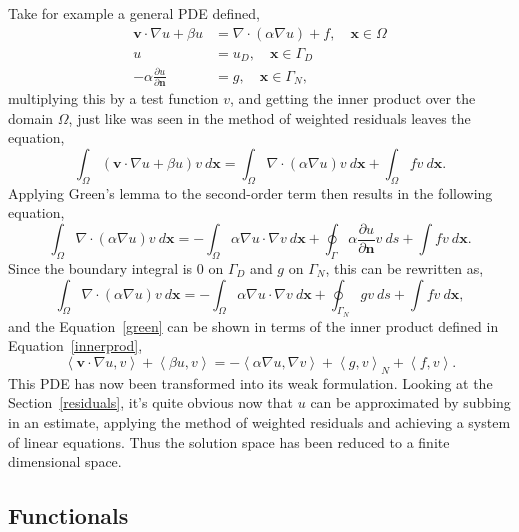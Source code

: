 Take for example a general PDE defined,
\begin{align}
	\mathbf{v}\cdot\nabla u + \beta u &= \nabla\cdot(\alpha\nabla u) + f,\quad  \mathbf{x} \in \Omega \\
	u &= u_D,\quad \mathbf{x} \in \Gamma_D\\
	-\alpha\frac{\partial u}{\partial \mathbf{n}} &= g,\quad \mathbf{x} \in \Gamma_N,
\end{align}
multiplying this by a test function $v$, and getting the inner product over the domain $\Omega$, just like was seen in the method of weighted residuals leaves the equation,
\begin{equation}\label{green}
		\int_{\Omega}(\mathbf{v}\cdot\nabla u + \beta u)v~d\mathbf{x} = \int_{\Omega}\nabla\cdot(\alpha\nabla u)v~d\mathbf{x} + \int_{\Omega}fv~d\mathbf{x}.
\end{equation}
Applying Green's lemma to the second-order term then results in the following equation,
\begin{equation}
	\int_{\Omega}\nabla\cdot(\alpha\nabla u)v~d\mathbf{x} = -\int_{\Omega}\alpha\nabla u\cdot \nabla v~d\mathbf{x} + \oint_{\Gamma} \alpha \frac{\partial u}{\partial \mathbf{n}} v~ds + \int fv~d\mathbf{x}.
\end{equation}
Since the boundary integral is $0$ on $\Gamma_D$ and $g$ on $\Gamma_N$, this can be rewritten as,
\begin{equation}
	\int_{\Omega}\nabla\cdot(\alpha\nabla u)v~d\mathbf{x} = -\int_{\Omega}\alpha\nabla u\cdot \nabla v~d\mathbf{x} + \oint_{\Gamma_N} gv~ds + \int fv~d\mathbf{x},
\end{equation}
and the Equation~\eqref{green} can be shown in terms of the inner product defined in Equation~\eqref{innerprod},
\begin{equation}\label{weak}
	\left\langle\mathbf{v}\cdot\nabla u,v\right\rangle + \left\langle\beta u,v\right\rangle = -\left\langle\alpha\nabla u, \nabla v\right\rangle + \left\langle g,v\right\rangle_N + \left\langle f,v\right\rangle.
\end{equation}
This PDE has now been transformed into its weak formulation. Looking at the Section~\ref{residuals}, it's quite obvious now that $u$ can be approximated by subbing in an estimate, applying the method of weighted residuals and achieving a system of linear equations. Thus the solution space has been reduced to a finite dimensional space.
\cite{mardal}

\subsection{Functionals}\label{functionals}

